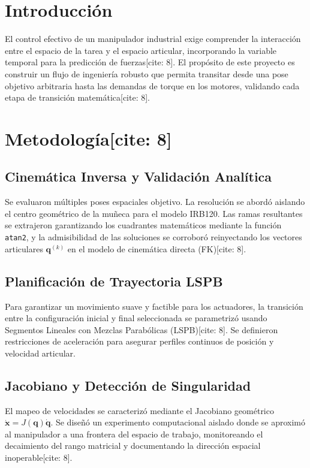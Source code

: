\documentclass[conference]{IEEEtran}
\begin{document}
\section{Introducción}
El control efectivo de un manipulador industrial exige comprender la interacción entre el espacio de la tarea y el espacio articular, incorporando la variable temporal para la predicción de fuerzas[cite: 8]. El propósito de este proyecto es construir un flujo de ingeniería robusto que permita transitar desde una pose objetivo arbitraria hasta las demandas de torque en los motores, validando cada etapa de transición matemática[cite: 8].

\section{Metodología[cite: 8]}

\subsection{Cinemática Inversa y Validación Analítica}
Se evaluaron múltiples poses espaciales objetivo. La resolución se abordó aislando el centro geométrico de la muñeca para el modelo IRB120. Las ramas resultantes se extrajeron garantizando los cuadrantes matemáticos mediante la función \texttt{atan2}, y la admisibilidad de las soluciones se corroboró reinyectando los vectores articulares $\mathbf{q}^{(k)}$ en el modelo de cinemática directa (FK)[cite: 8].

\subsection{Planificación de Trayectoria LSPB}
Para garantizar un movimiento suave y factible para los actuadores, la transición entre la configuración inicial y final seleccionada se parametrizó usando Segmentos Lineales con Mezclas Parabólicas (LSPB)[cite: 8]. Se definieron restricciones de aceleración para asegurar perfiles continuos de posición y velocidad articular.

\subsection{Jacobiano y Detección de Singularidad}
El mapeo de velocidades se caracterizó mediante el Jacobiano geométrico $\dot{\mathbf{x}} = J(\mathbf{q})\dot{\mathbf{q}}$. Se diseñó un experimento computacional aislado donde se aproximó al manipulador a una frontera del espacio de trabajo, monitoreando el decaimiento del rango matricial y documentando la dirección espacial inoperable[cite: 8].
\end{document}
